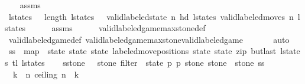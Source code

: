 \begin{isabellebody}
%
\isadelimproof
\ \ %
\endisadelimproof
%
\isatagproof
{}\isamarkupfalse%
\ assms\isanewline
{}\isamarkupfalse%
{\isacharminus}\isanewline
\ \ \isamarkupfalse%
\ {\isachardoublequoteopen}l{\isacharunderscore}states\ {\isasymnoteq}\ {\isacharbrackleft}{\isacharbrackright}{\isachardoublequoteclose}\ {\isachardoublequoteopen}length\ l{\isacharunderscore}states\ {\isasymge}\ {}{\isachardoublequoteclose}\ {\isachardoublequoteopen}valid{\isacharunderscore}labeled{\isacharunderscore}state\ n\ {\isacharparenleft}hd\ l{\isacharunderscore}states{\isacharparenright}{\isachardoublequoteclose}\ {\isachardoublequoteopen}valid{\isacharunderscore}labeled{\isacharunderscore}moves\ n\ l{\isacharunderscore}states{\isachardoublequoteclose}\isanewline
\ \ \ \ \isamarkupfalse%
\ assms\isanewline
\ \ \ \ \isamarkupfalse%
\ valid{\isacharunderscore}labeled{\isacharunderscore}game{\isacharunderscore}max{\isacharunderscore}stone{\isacharunderscore}def\isanewline
\ \ \ \ \isamarkupfalse%
\ valid{\isacharunderscore}labeled{\isacharunderscore}game{\isacharunderscore}def\ valid{\isacharunderscore}labeled{\isacharunderscore}game{\isacharunderscore}max{\isacharunderscore}stone{\isacharunderscore}valid{\isacharunderscore}labeled{\isacharunderscore}game\ \isanewline
\ \ \ \ \isamarkupfalse%
\ auto\isanewline
\isanewline
\ \ \isamarkupfalse%
\ {\isacharquery}ss\ {\isacharequal}\ {\isachardoublequoteopen}map\ {\isacharparenleft}{\isasymlambda}\ {\isacharparenleft}state{\isacharcomma}\ state{\isacharprime}{\isacharparenright}{\isachardot}\ {\isacharparenleft}state{\isacharcomma}\ labeled{\isacharunderscore}move{\isacharunderscore}positions\ state\ state{\isacharprime}{\isacharparenright}{\isacharparenright}\ {\isacharparenleft}zip\ {\isacharparenleft}butlast\ l{\isacharunderscore}states{\isacharparenright}\ {\isacharparenleft}tl\ l{\isacharunderscore}states{\isacharparenright}{\isacharparenright}{\isachardoublequoteclose}\isanewline
\ \ \isamarkupfalse%
\ {\isacharquery}sstone\ {\isacharequal}\ {\isachardoublequoteopen}{\isasymlambda}\ stone{\isachardot}\ filter\ {\isacharparenleft}{\isasymlambda}\ {\isacharparenleft}state{\isacharcomma}\ p{}{\isacharcomma}\ p{}{\isacharcomma}\ stone{\isacharprime}{\isacharparenright}{\isachardot}\ stone{\isacharprime}\ {\isacharequal}\ stone{\isacharparenright}\ {\isacharquery}ss{\isachardoublequoteclose}\isanewline
\isanewline
\ \ \isamarkupfalse%
\ {\isachardoublequoteopen}{\isacharparenleft}{\isasymSum}\ k\ {\isasymleftarrow}\ {\isacharbrackleft}{}{\isachardot}{\isachardot}{\isacharless}n{\isacharplus}{}{\isacharbrackright}{\isachardot}\ {\isacharparenleft}ceiling\ {\isacharparenleft}n\ {\isacharslash}\ k{\isacharparenright}{\isacharparenright}{\isacharparenright}\ {\isacharequal}\ \isanewline

\end{isabellebody}
